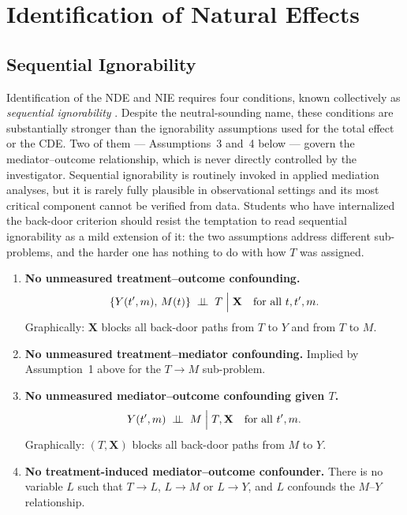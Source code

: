\documentclass[master.tex]{subfiles}
\begin{document}
\section{Identification of Natural Effects}
\label{w8:sec:id-natural}

\subsection{Sequential Ignorability}

Identification of the NDE and NIE requires four conditions, known
collectively as \emph{sequential ignorability}
\citep{imai2010identification}.  Despite the neutral-sounding name,
these conditions are substantially stronger than the ignorability
assumptions used for the total effect or the CDE.  Two of them ---
Assumptions~3 and~4 below --- govern the mediator--outcome
relationship, which is never directly controlled by the investigator.
Sequential ignorability is routinely invoked in applied mediation
analyses, but it is rarely fully plausible in observational settings
and its most critical component cannot be verified from data.  Students
who have internalized the back-door criterion should resist the
temptation to read sequential ignorability as a mild extension of it:
the two assumptions address different sub-problems, and the harder one
has nothing to do with how $T$ was assigned.

\begin{tcolorbox}[defstyle, title={Sequential Ignorability Assumptions}]
\begin{enumerate}
  \item \textbf{No unmeasured treatment--outcome confounding.}
    \[
      \{Y(t', m),\, M(t)\} \;\perp\!\!\!\perp\; T \;\Big|\; \mathbf{X}
      \quad \text{for all } t, t', m.
    \]
    Graphically: $\mathbf{X}$ blocks all back-door paths from $T$ to
    $Y$ and from $T$ to $M$.
  \item \textbf{No unmeasured treatment--mediator confounding.}
    Implied by Assumption~1 above for the $T \to M$ sub-problem.
  \item \textbf{No unmeasured mediator--outcome confounding given $T$.}
    \[
      Y(t', m) \;\perp\!\!\!\perp\; M \;\Big|\; T, \mathbf{X}
      \quad \text{for all } t', m.
    \]
    Graphically: $(T, \mathbf{X})$ blocks all back-door paths from $M$
    to $Y$.
  \item \textbf{No treatment-induced mediator--outcome confounder.}
    There is no variable $L$ such that $T \to L$, $L \to M$ or $L \to Y$,
    and $L$ confounds the $M$--$Y$ relationship.
\end{enumerate}
\end{tcolorbox}
\end{document}
